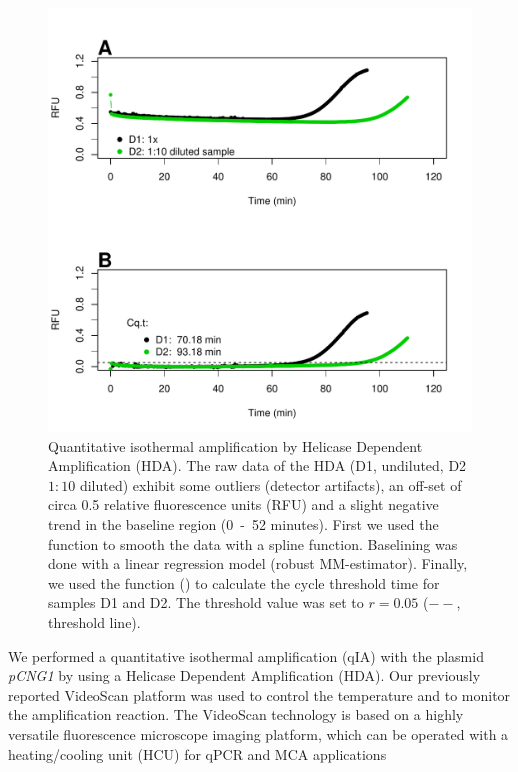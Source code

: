 \begin{figure}[htbp]
  \centering
  \includegraphics[clip=true, width=14cm]{figures/qIA.pdf}
  \caption{Quantitative isothermal amplification by Helicase Dependent 
Amplification (HDA).  The raw data of the HDA (D1, undiluted, D2 
$1:10$ diluted) exhibit some outliers (detector artifacts), an off-set of circa 
0.5 relative fluorescence units (RFU) and a slight negative trend in the 
baseline region (0~-~52 minutes).  First we used the  
function to smooth the data with a spline function. Baselining was done with a 
linear regression model (robust MM-estimator). Finally, we used the 
 function () to calculate the cycle threshold 
time for samples D1 and 
D2. The threshold value was set to $r = 0.05$ ($--$, threshold line).}
  \label{figure:qIA}
\end{figure}
We performed a quantitative isothermal amplification (qIA) with the plasmid 
\textit{pCNG1} by using a Helicase Dependent Amplification (HDA). Our 
previously 
reported VideoScan platform \citep{rodiger_highly_2013} was used to control the 
temperature and to monitor the amplification reaction. The VideoScan technology 
is based 
on a highly versatile fluorescence microscope imaging platform, which can be 
operated with a heating/cooling unit (HCU) for qPCR and MCA applications 
